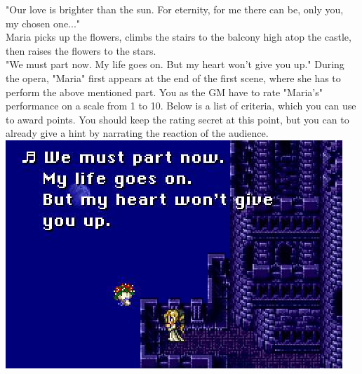 "Our love is brighter than the sun. For eternity, for me there can be, only you, my chosen one..."\vspace{0.2cm}\\ 
Maria picks up the flowers, climbs the stairs to the balcony high atop the castle, then raises the flowers to the stars.\vspace{0.2cm}\\
"We must part now. My life goes on. But my heart won't give you up."
%
%
\vfill
%
During the opera, "Maria" first appears at the end of the first scene, where she has to perform the above mentioned part.
You as the GM have to rate "Maria's" performance on a scale from 1 to 10.
Below is a list of criteria, which you can use to award points.
You should keep the rating secret at this point, but you can to already give a hint by narrating the reaction of the audience.
%
\clearpage
%
\includegraphics[width=\columnwidth]{./art/mariaanddraco/maria.jpg}\\
%
\vfill
%
%
\vfill
%
